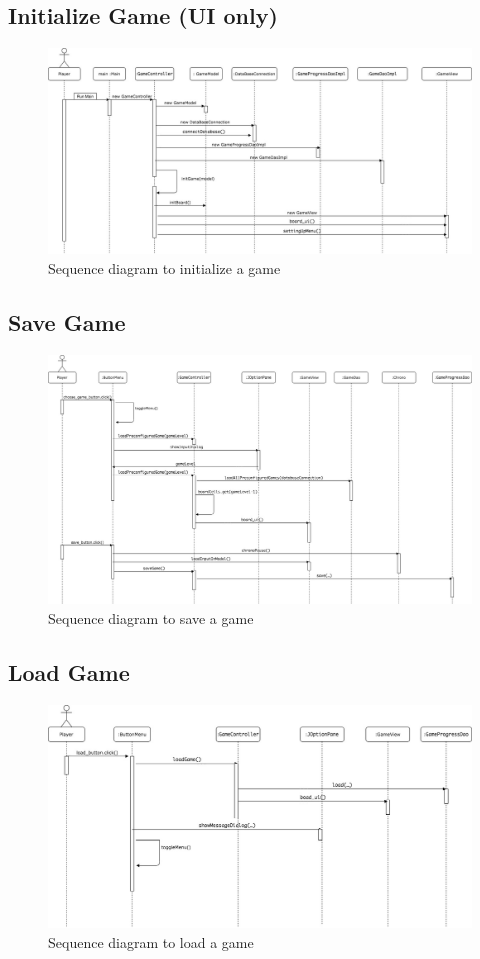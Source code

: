 \documentclass[12pt]{article}
\begin{document}
\subsection{Initialize Game (UI only)}
\begin{figure}[htbp]
    \includegraphics[width=1\textwidth]{initializeGame_UI}
    \caption{Sequence diagram to initialize a game}
    \label{fig:sequenceDiagram}
\end{figure}

\newpage

\subsection{Save Game}
\begin{figure}[htbp]
    \includegraphics[width=1\textwidth]{saveGame}
    \caption{Sequence diagram to save a game}
    \label{fig:sequenceDiagram}
\end{figure}

\newpage

\subsection{Load Game}
\begin{figure}[htbp]
    \includegraphics[width=1\textwidth]{loadGame}
    \caption{Sequence diagram to load a game}
    \label{fig:sequenceDiagram}
\end{figure}
\end{document}

